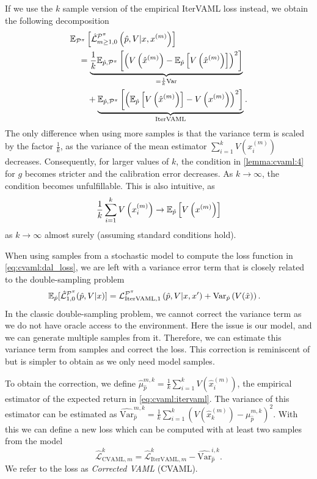 If we use the $k$ sample version of the empirical IterVAML loss instead, we obtain the following decomposition
\begin{align}
    &\EEX{\P^\pi}{\hat{\mathcal{L}}^{\P^\pi}_{m\geq1,0}\left(\hat{p},V|x,x^{(m)}\right)} \\
    &\quad = \underbrace{\frac{1}{k}\EEX{\hat{p},\P^\pi}{\left(V\left(\hat{x}^{(m)}\right) - \EEX{\hat{p}}{V\left(\hat{x}^{(m)}\right)}\right)^2}}_{=\frac{1}{k} \mathrm{Var}} \nonumber\\
    &\quad \quad + \underbrace{\EEX{\hat{p},\P^\pi}{\left(\EEX{\hat{p}}{V\left(\hat{x}^{(m)}\right)} - V\left(x^{(m)}\right)\right)^2}}_{\mathrm{IterVAML}}.
\end{align}
The only difference when using more samples is that the variance term is scaled by the factor $\frac{1}{k}$, as the variance of the mean estimator $\sum_{i=1}^k V\left(x^{(m)}_i\right)$ decreases.
Consequently, for larger values of $k$, the condition in \autoref{lemma:cvaml:4} for $g$ becomes stricter and the calibration error decreases.
As $k \rightarrow \infty$, the condition becomes unfulfillable. 
This is also intuitive, as $$\frac{1}{k}\sum_{i=1}^k V\left(x^{(m)}_i\right) \rightarrow \EEX{\hat{p}}{V\left(x^{(m)}\right)}$$ as $k \rightarrow \infty$ almost surely (assuming standard conditions hold).


When using samples from a stochastic model to compute the loss function in \autoref{eq:cvaml:dal_loss}, we are left with a variance error term that is closely related to the double-sampling problem
\begin{align}
 &\mathbb{E}_{\hat{p}}[\hat{\mathcal{L}}^{\P^\pi}_{1,0}(\hat{p},V|x)] = {\mathcal{L}}^{\P^\pi}_{\mathrm{IterVAML}, 1}\left(\hat{p},V|x,x'\right) + \mathrm{Var}_{\hat{p}}\left(V(\hat{x})\right).
\end{align}
In the classic double-sampling problem, we cannot correct the variance term as we do not have oracle access to the environment.
Here the issue is our model, and we can generate multiple samples from it.
Therefore, we can estimate this variance term from samples and correct the loss.
This correction is reminiscent of \textcite{antos2008learning} but is simpler to obtain as we only need model samples.

To obtain the correction, we define $\hat{\mu}_{\hat{p}}^{m,k} = \frac{1}{k}\sum_{i=1}^k V(\hat{x}_i^{(m)})$, the empirical estimator of the expected return in \autoref{eq:cvaml:itervaml}.
The variance of this estimator can be estimated as $\widehat{\mathrm{Var}}_{\hat{p}}^{m,k} = \frac{1}{k} \sum_{i=1}^{k} (V(\hat{x}_k^{(m)}) - \mu_{\hat{p}}^{m,k})^2$.
With this we can define a new loss which can be computed with at least two samples from the model
$$\hat{\mathcal{L}}_{\mathrm{CVAML}, m}^{k} = \hat{\mathcal{L}}^k_{\mathrm{IterVAML}, m} - \widehat{\mathrm{Var}}_{\hat{p}}^{i,k}.$$
We refer to the loss as \emph{Corrected VAML} (CVAML).


